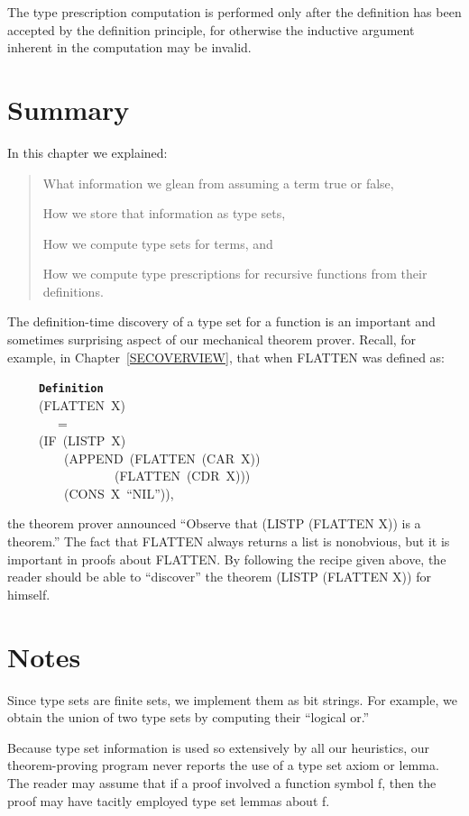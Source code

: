 \documentclass[11pt]{book}
\newenvironment{pubasis}{\begin{flushleft}\ttfamily\small}{\normalsize\rmfamily\end{flushleft}}
\newenvironment{pubcrown}{\begin{quote}}{\end{quote}}
\newcommand{\axiomordefinition}[1]{\vspace{6pt}\texttt{\textbf{#1}}}
\newcommand{\pubdefaulttextsize}{\large}
\begin{document}
The type prescription computation is performed only after the
definition has been accepted  by the definition principle, for
otherwise the inductive argument inherent in the  computation
may be invalid.
\section{Summary}
\pubdefaulttextsize
In this chapter we explained:
\begin{pubcrown}
What information we glean from assuming a term true or false,

How we store that information as type sets,

How we compute type sets for terms, and

How we compute type prescriptions for recursive functions from
their definitions.
\end{pubcrown}
The definition-time discovery of a type set for a function
is an important and sometimes surprising aspect of our mechanical
theorem prover.  Recall, for example, in Chapter~\ref{SECOVERVIEW}, that when
FLATTEN was defined as:
\begin{pubasis}
~~~~~\axiomordefinition{Definition}\\
~~~~~(FLATTEN~X)\\
~~~~~~~~=\\
~~~~~(IF~(LISTP~X)\\
~~~~~~~~~(APPEND~(FLATTEN~(CAR~X))\\
~~~~~~~~~~~~~~~~~(FLATTEN~(CDR~X)))\\
~~~~~~~~~(CONS~X~``NIL'')),\\
\end{pubasis}
the theorem prover announced ``Observe that (LISTP (FLATTEN X)) is a
theorem.''  The fact that FLATTEN always returns a list is nonobvious, but
it is important in proofs about FLATTEN.  By following the recipe
given above, the reader should be able to ``discover'' the theorem
(LISTP (FLATTEN X)) for himself.
\section{Notes}
\pubdefaulttextsize
Since type sets are finite sets, we implement them as bit strings.
For example, we obtain the union of two type sets by computing
their ``logical or.''

Because type set information is used so extensively by all our heuristics,
our theorem-proving program never reports the use of a type set axiom
or lemma.  The reader may assume that if a proof involved a function
symbol f, then the proof may have tacitly employed type set lemmas about f.
\end{document}
